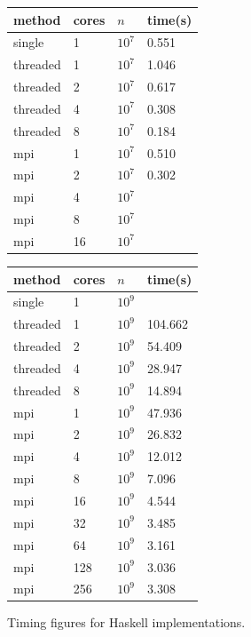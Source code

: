 \documentclass{tmr}
\begin{document}
\begin{figure}
\begin{minipage}[b]{0.5\linewidth}\centering
\begin{tabular}{|l|l|l|l|} \hline
method & cores & $n$ & time(s) \\ \hline\hline
single & 1     & $10^7$ & 0.551 \\ \hline\hline
threaded & 1   & $10^7$ & 1.046 \\ \hline
threaded & 2   & $10^7$ & 0.617 \\ \hline
threaded & 4   & $10^7$ & 0.308 \\ \hline
threaded & 8   & $10^7$ & 0.184 \\ \hline\hline
mpi & 1   & $10^7$ & 0.510 \\ \hline
mpi & 2   & $10^7$ & 0.302  \\ \hline
mpi & 4   & $10^7$ &       \\ \hline
mpi & 8   & $10^7$ &       \\ \hline
mpi & 16  & $10^7$ &       \\ \hline
\end{tabular}
\end{minipage}
\hspace{0.5cm}
\begin{minipage}[b]{0.5\linewidth}
\centering
\begin{tabular}{|l|l|l|l|} \hline
method & cores & $n$ & time(s) \\ \hline\hline
single & 1     & $10^9$ & \\ \hline\hline
threaded & 1   & $10^9$ & 104.662 \\ \hline
threaded & 2   & $10^9$ & 54.409 \\ \hline
threaded & 4   & $10^9$ & 28.947  \\ \hline
threaded & 8   & $10^9$ & 14.894 \\ \hline\hline
mpi & 1   & $10^9$ & 47.936 \\ \hline
mpi & 2   & $10^9$ & 26.832  \\ \hline
mpi & 4   & $10^9$ & 12.012 \\ \hline
mpi & 8   & $10^9$ & 7.096 \\ \hline
mpi & 16  & $10^9$ & 4.544 \\ \hline
mpi & 32 & $10^9$ & 3.485 \\ \hline
mpi & 64   & $10^9$ & 3.161 \\ \hline
mpi & 128   & $10^9$ & 3.036 \\ \hline
mpi & 256 & $10^9$ & 3.308 \\ \hline
\end{tabular}
\end{minipage}
\vspace{3mm}
\caption{Timing figures for Haskell implementations. \label{TiminigTable}}
\end{figure}
\end{document}
